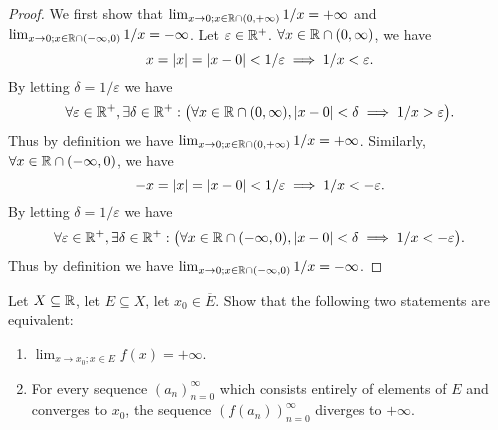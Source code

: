 \begin{proof}
  We first show that \(\lim_{x \to 0 ; x \in \mathbb{R} \cap (0, +\infty)} 1 / x = +\infty\) and \(\lim_{x \to 0 ; x \in \mathbb{R} \cap (-\infty, 0)} 1 / x = -\infty\).
  Let \(\varepsilon \in \mathbb{R}^+\).
  \(\forall x \in \mathbb{R} \cap (0, \infty)\), we have
  \[
    x = \left\lvert x\right\rvert = \left\lvert x - 0\right\rvert < 1 / \varepsilon \implies 1 / x < \varepsilon.
  \]
  By letting \(\delta = 1 / \varepsilon\) we have
  \[
    \forall \varepsilon \in \mathbb{R}^+, \exists \delta \in \mathbb{R}^+ : \big(\forall x \in \mathbb{R} \cap (0, \infty), \left\lvert x - 0\right\rvert < \delta \implies 1 / x > \varepsilon\big).
  \]
  Thus by definition we have \(\lim_{x \to 0 ; x \in \mathbb{R} \cap (0, +\infty)} 1 / x = +\infty\).
  Similarly, \(\forall x \in \mathbb{R} \cap (-\infty, 0)\), we have
  \[
    -x = \left\lvert x\right\rvert = \left\lvert x - 0\right\rvert < 1 / \varepsilon \implies 1 / x < -\varepsilon.
  \]
  By letting \(\delta = 1 / \varepsilon\) we have
  \[
    \forall \varepsilon \in \mathbb{R}^+, \exists \delta \in \mathbb{R}^+ : \big(\forall x \in \mathbb{R} \cap (-\infty, 0), \left\lvert x - 0\right\rvert < \delta \implies 1 / x < -\varepsilon\big).
  \]
  Thus by definition we have \(\lim_{x \to 0 ; x \in \mathbb{R} \cap (-\infty, 0)} 1 / x = -\infty\).
\end{proof}

\begin{ac}\label{ac:9.5.3}
  Let \(X \subseteq \mathbb{R}\), let \(E \subseteq X\), let \(x_0 \in \overline{E}\).
  Show that the following two statements are equivalent:
  \begin{enumerate}
    \item \(\lim_{x \to x_0 ; x \in E} f(x) = +\infty\).
    \item For every sequence \((a_n)_{n = 0}^\infty\) which consists entirely of elements of \(E\) and converges to \(x_0\), the sequence \((f(a_n))_{n = 0}^\infty\) diverges to \(+\infty\).
  \end{enumerate}
\end{ac}

